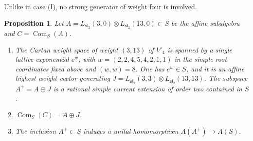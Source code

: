 \documentclass[leqno]{article}
\newcommand{\ot}{\otimes}
\newtheorem{prop}[thm]{Proposition}
\numberwithin{equation}{section}
\begin{document}
Unlike in case (I), no strong generator of weight four is involved.

\begin{prop}
\label{prop:simple-current}
Let $A = L_{\mathfrak{sl}_2}(3,0) \ot L_{\mathfrak{sl}_2}(13,0) \subset S$ be the affine subalgebra and $C = \operatorname{Com}_S(A)$.
\begin{enumerate}
\item The Cartan weight space of weight $(3,13)$ of $V'_4$ is spanned by a single lattice exponential $e^w$, with $w = (2,2,4,5,4,2,1,1)$ in the simple-root coordinates fixed above and $(w,w) = 8$. One has $e^w \in S$, and it is an affine highest weight vector generating $J = L_{\mathfrak{sl}_2}(3,3) \ot L_{\mathfrak{sl}_2}(13,13)$. The subspace $A^+ = A \oplus J$ is a rational simple current extension of order two contained in $S$.
\item $\operatorname{Com}_S(C) = A \oplus J$.
\item The inclusion $A^+ \subset S$ induces a unital homomorphism $A(A^+) \to A(S)$.
\end{enumerate}
\end{prop}
\end{document}

